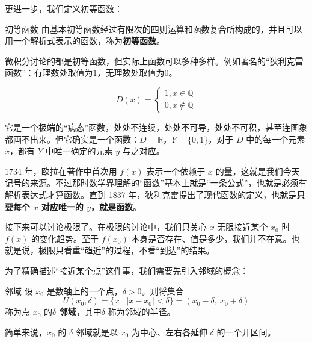 更进一步，我们定义初等函数：

\begin{definition}{初等函数}{}
由基本初等函数经过有限次的四则运算和函数复合所构成的，并且可以用一个解析式表示的函数，称为\textbf{初等函数}。
\end{definition}

微积分讨论的都是初等函数，但实际上函数可以多种多样。例如著名的“狄利克雷函数”：有理数处取值为$1$，无理数处取值为$0$。

\[
D(x)=
\begin{cases}
  1,x\in \mathbb{Q} \\
  0,x\notin \mathbb{Q} 
\end{cases}
\]

它是一个极端的“病态”函数，处处不连续，处处不可导，处处不可积，甚至连图象都画不出来。但它确实是一个函数：$D=\mathbb{R} $，$Y=\{0,1\}$，对于 $D$ 中的每一个元素 $x$，都有 $Y$ 中唯一确定的元素 $y$ 与之对应。

1734 年，欧拉在著作中首次用 $f(x)$ 表示一个依赖于 $x$ 的量，这就是我们今天记号的来源。不过那时数学界理解的“函数”基本上就是“一条公式”，也就是必须有解析表达式才算函数。直到 1837 年，狄利克雷提出了现代函数的定义，也就是\textbf{只要每个 $x$ 对应唯一的 $y$，就是函数}。

接下来可以讨论极限了。在极限的讨论中，我们只关心 $x$ 无限接近某个 $x_0$ 时 $f(x)$ 的变化趋势。至于 $f(x_0)$ 本身是否存在、值是多少，我们并不在意。也就是说，极限只看重“趋近”的过程，不看“到达”的结果。

为了精确描述“接近某个点”这件事，我们需要先引入邻域的概念：

\begin{definition}{邻域}{}
设 $x_0$ 是数轴上的一个点，$\delta > 0$。则将集合
\[
U(x_0, \delta) = \{ x \mid |x - x_0| < \delta \} = (x_0 - \delta,\ x_0 + \delta)
\]
称为点 $x_0$ 的\textbf{$\delta$ 邻域}，其中$\delta$ 称为邻域的半径。
\end{definition}

简单来说，$x_0$ 的 $\delta$ 邻域就是以 $x_0$ 为中心、左右各延伸 $\delta$ 的一个开区间。

